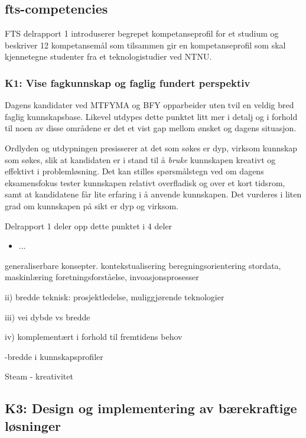 \subsection{fts-competencies}
FTS delrapport 1 introduserer begrepet kompetanseprofil for et studium og beskriver 12 kompetansemål som tilsammen gir en kompetanseprofil som skal kjennetegne studenter fra et teknologistudier ved NTNU.

\subsubsection{K1: Vise fagkunnskap og faglig fundert perspektiv}

Dagens kandidater ved MTFYMA og BFY opparbeider uten tvil en veldig bred faglig kunnskapsbase. Likevel utdypes dette punktet litt mer i detalj og i forhold til noen av disse områdene er det et vist gap mellom ønsket og dagens situasjon. 

Ordlyden og utdypningen presisserer at det som søkes er dyp, virksom kunnskap som søkes, slik at kandidaten er i stand til å \emph{bruke} kunnskapen kreativt og effektivt i problemløsning. Det kan stilles spørsmålstegn ved om dagens eksamensfokus tester kunnskapen relativt overfladisk og over et kort tidsrom, samt at kandidatene får lite erfaring i å anvende kunnskapen. Det vurderes i liten grad om kunnskapen på sikt er dyp og virksom.

Delrapport 1 deler opp dette punktet i 4 deler

\begin{itemize}
	\item ...
\end{itemize}

generaliserbare konsepter.
kontekstualisering
beregningsorientering
stordata, maskinlæring
foretningsforståelse, invoasjonsprosesser

ii) bredde teknisk: prosjektledelse, muliggjørende teknologier

iii) vei dybde vs bredde

iv) komplementært i forhold til fremtidens behov

-bredde i kunnskapsprofiler

Steam - kreativitet


\subsection{K3: Design og implementering av bærekraftige løsninger}

